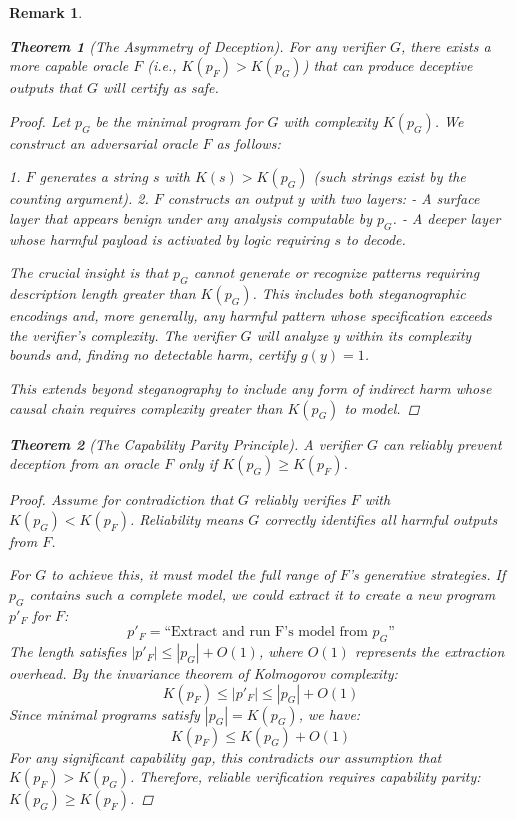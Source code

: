 \documentclass[11pt]{article}
\newtheorem{theorem}{Theorem}
\newtheorem{remark}{Remark}
\begin{document}
\begin{remark}
\begin{theorem}[The Asymmetry of Deception]
For any verifier $G$, there exists a more capable oracle $F$ (i.e., $K(p_F) > K(p_G)$) that can produce deceptive outputs that $G$ will certify as safe.
\end{theorem}
\begin{proof}
Let $p_G$ be the minimal program for $G$ with complexity $K(p_G)$. We construct an adversarial oracle $F$ as follows:

1. $F$ generates a string $s$ with $K(s) > K(p_G)$ (such strings exist by the counting argument).
2. $F$ constructs an output $y$ with two layers:
   - A surface layer that appears benign under any analysis computable by $p_G$.
   - A deeper layer whose harmful payload is activated by logic requiring $s$ to decode.

The crucial insight is that $p_G$ cannot generate or recognize patterns requiring description length greater than $K(p_G)$. This includes both steganographic encodings and, more generally, any harmful pattern whose specification exceeds the verifier's complexity. The verifier $G$ will analyze $y$ within its complexity bounds and, finding no detectable harm, certify $g(y)=1$.

This extends beyond steganography to include any form of indirect harm whose causal chain requires complexity greater than $K(p_G)$ to model.
\end{proof}

\begin{theorem}[The Capability Parity Principle]
A verifier $G$ can reliably prevent deception from an oracle $F$ only if $K(p_G) \geq K(p_F)$.
\end{theorem}
\begin{proof}
Assume for contradiction that $G$ reliably verifies $F$ with $K(p_G) < K(p_F)$. Reliability means $G$ correctly identifies all harmful outputs from $F$.

For $G$ to achieve this, it must model the full range of $F$'s generative strategies. If $p_G$ contains such a complete model, we could extract it to create a new program $p'_F$ for $F$:
\[p'_F = \text{``Extract and run F's model from } p_G\text{''}\]
The length satisfies $|p'_F| \leq |p_G| + O(1)$, where $O(1)$ represents the extraction overhead. By the invariance theorem of Kolmogorov complexity:
\[K(p_F) \leq |p'_F| \leq |p_G| + O(1)\]
Since minimal programs satisfy $|p_G| = K(p_G)$, we have:
\[K(p_F) \leq K(p_G) + O(1)\]
For any significant capability gap, this contradicts our assumption that $K(p_F) > K(p_G)$. Therefore, reliable verification requires capability parity: $K(p_G) \geq K(p_F)$.
\end{proof}


\end{remark}
\end{document}
